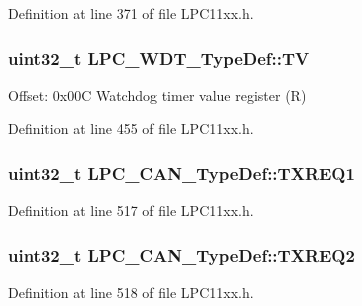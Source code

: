 Definition at line 371 of file L\+P\+C11xx.\+h.

\subsubsection[{\texorpdfstring{TV}{TV}}]{ uint32\+\_\+t L\+P\+C\+\_\+\+W\+D\+T\+\_\+\+Type\+Def\+::\+TV}\hypertarget{group___l_p_c11xx___definitions_ga6788dee11cb43f56bcfdde5bf58b98b0}{}\label{group___l_p_c11xx___definitions_ga6788dee11cb43f56bcfdde5bf58b98b0}
Offset\+: 0x00C Watchdog timer value register (R) 

Definition at line 455 of file L\+P\+C11xx.\+h.

\subsubsection[{\texorpdfstring{T\+X\+R\+E\+Q1}{TXREQ1}}]{ uint32\+\_\+t L\+P\+C\+\_\+\+C\+A\+N\+\_\+\+Type\+Def\+::\+T\+X\+R\+E\+Q1}\hypertarget{group___l_p_c11xx___definitions_ga4d4eebce6a7b6b29f8556faec742ab9a}{}\label{group___l_p_c11xx___definitions_ga4d4eebce6a7b6b29f8556faec742ab9a}


Definition at line 517 of file L\+P\+C11xx.\+h.

\subsubsection[{\texorpdfstring{T\+X\+R\+E\+Q2}{TXREQ2}}]{ uint32\+\_\+t L\+P\+C\+\_\+\+C\+A\+N\+\_\+\+Type\+Def\+::\+T\+X\+R\+E\+Q2}\hypertarget{group___l_p_c11xx___definitions_gacd04e0f2c97733548cc5150c2f714be2}{}\label{group___l_p_c11xx___definitions_gacd04e0f2c97733548cc5150c2f714be2}


Definition at line 518 of file L\+P\+C11xx.\+h.

